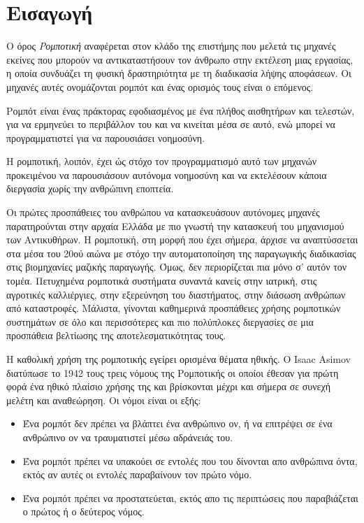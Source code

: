 \chapter{Εισαγωγή}
\label{chapter:intro}

Ο όρος \emph{Ρομποτική} αναφέρεται στον κλάδο της επιστήμης που μελετά τις μηχανές εκείνες που μπορούν να αντικαταστήσουν τον άνθρωπο στην εκτέλεση μιας εργασίας, η οποία συνδυάζει τη φυσική δραστηριότητα με τη διαδικασία λήψης αποφάσεων. 
Οι μηχανές αυτές ονομάζονται ρομπότ και ένας ορισμός τους είναι ο επόμενος.
\begin{displayquote} Ρομπότ είναι ένας πράκτορας εφοδιασμένος με ένα πλήθος αισθητήρων και τελεστών, για να ερμηνεύει το περιβάλλον του και να κινείται μέσα σε αυτό, ενώ μπορεί να προγραμματιστεί για να παρουσιάσει νοημοσύνη. 
\end{displayquote}
Η ρομποτική, λοιπόν, έχει ώς στόχο τον προγραμματισμό αυτό των μηχανών προκειμένου να παρουσιάσουν αυτόνομα νοημοσύνη και να εκτελέσουν κάποια διεργασία χωρίς την ανθρώπινη εποπτεία.

Οι πρώτες προσπάθειες του ανθρώπου να κατασκευάσουν αυτόνομες μηχανές παρατηρούνται στην αρχαία Ελλάδα με πιο γνωστή την κατασκευή του μηχανισμού των Αντικυθήρων. Η ρομποτική, στη μορφή που έχει σήμερα, άρχισε να αναπτύσσεται στα μέσα του 20ού αιώνα με στόχο την αυτοματοποίηση της παραγωγικής διαδικασίας στις βιομηχανίες μαζικής παραγωγής. Όμως, δεν περιορίζεται πια μόνο σ' αυτόν τον τομέα. Πετυχημένα ρομποτικά συστήματα συναντά κανείς στην ιατρική, στις αγροτικές καλλιέργιες, στην εξερεύνηση του διαστήματος, στην διάσωση ανθρώπων από καταστροφές. Μάλιστα, γίνονται καθημερινά προσπάθειες χρήσης ρομποτικών συστημάτων σε όλο και περισσότερες και πιο πολύπλοκες διεργασίες σε μια προσπάθεια βελτίωσης της αποτελεσματικότητας τους. 

Η καθολική χρήση της ρομποτικής εγείρει ορισμένα θέματα ηθικής. Ο Isaac Asimov διατύπωσε το 1942 τους τρεις νόμους της Ρομποτικής \cite{mccauley2007} οι οποίοι έθεσαν για πρώτη φορά ένα ηθικό πλαίσιο χρήσης της και βρίσκονται μέχρι και σήμερα σε συνεχή μελέτη και αναθεώρηση. Οι νόμοι είναι οι εξής:
\begin{displayquote}
    \begin{itemize}
        \item{Ένα ρομπότ δεν πρέπει να βλάπτει ένα ανθρώπινο ον, ή να επιτρέψει σε ένα ανθρώπινο ον να τραυματιστεί μέσω αδράνειάς του.}
        \item{Ένα ρομπότ πρέπει να υπακούει σε εντολές που του δίνονται απο ανθρώπινα όντα, εκτός αν αυτές οι εντολές παραβαίνουν τον πρώτο νόμο.}
        \item{Ένα ρομπότ πρέπει να προστατεύεται, εκτός απο τις περιπτώσεις που παραβιάζεται ο πρώτος ή ο δεύτερος νόμος.}
    \end{itemize}
\end{displayquote}






